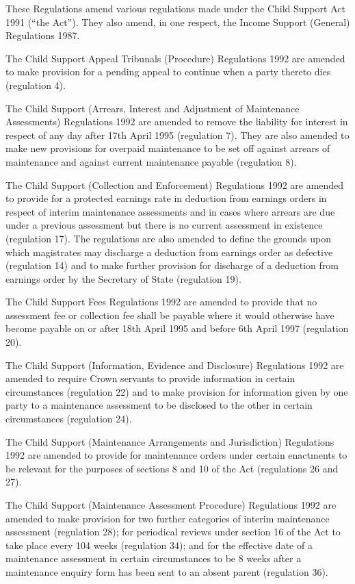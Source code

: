 \documentclass[a4paper]{article}
\begin{document}
These Regulations amend various regulations made under the Child Support Act 1991 (“the Act”). They also amend, in one respect, the Income Support (General) Regulations 1987.

  The Child Support Appeal Tribunals (Procedure) Regulations 1992 are amended to make provision for a pending appeal to continue when a party thereto dies (regulation 4).

  The Child Support (Arrears, Interest and Adjustment of Maintenance Assessments) Regulations 1992 are amended to remove the liability for interest in respect of any day after 17th April 1995 (regulation 7). They are also amended to make new provisions for overpaid maintenance to be set off against arrears of maintenance and against current maintenance payable (regulation 8).

\begin{sloppypar}
  The Child Support (Collection and Enforcement) Regulations 1992 are amended to provide for a protected earnings rate in deduction from earnings orders in respect of interim maintenance assessments and in cases where arrears are due under a previous assessment but there is no current assessment in existence (regulation 17). The regulations are also amended to define the grounds upon which magistrates may discharge a deduction from earnings order as defective (regulation 14) and to make further provision for discharge of a deduction from earnings order by the Secretary of State (regulation 19).
\end{sloppypar}

  The Child Support Fees Regulations 1992 are amended to provide that no assessment fee or collection fee shall be payable where it would otherwise have become payable on or after 18th April 1995 and before 6th April 1997 (regulation 20).

  The Child Support (Information, Evidence and Disclosure) Regulations 1992 are amended to require Crown servants to provide information in certain circumstances (regulation 22) and to make provision for information given by one party to a maintenance assessment to be disclosed to the other in certain circumstances (regulation 24).

  The Child Support (Maintenance Arrangements and Jurisdiction) Regulations 1992 are amended to provide for maintenance orders under certain enactments to be relevant for the purposes of sections 8 and 10 of the Act (regulations 26 and 27).

  The Child Support (Maintenance Assessment Procedure) Regulations 1992 are amended to make provision for two further categories of interim maintenance assessment (regulation 28); for periodical reviews under section 16 of the Act to take place every 104 weeks (regulation 34); and for the effective date of a maintenance assessment in certain circumstances to be 8 weeks after a maintenance enquiry form has been sent to an absent parent (regulation 36).
\end{document}
